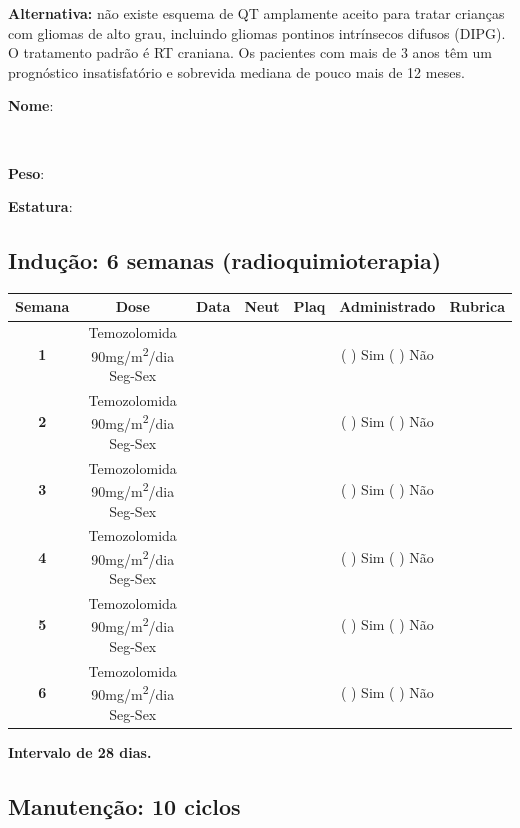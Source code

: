 \documentclass[11pt,a4paper,oldfontcommands]{memoir}
\def\entrywithlabel[#1]#2{\parbox{#1}{{\small #2:} \hrulefill}}
\begin{document}
\textbf{Alternativa:} não existe esquema de QT amplamente aceito para tratar crianças com gliomas de alto grau, incluindo gliomas pontinos intrínsecos difusos (DIPG). O tratamento padrão é RT craniana. Os pacientes com mais de 3 anos têm um prognóstico insatisfatório e sobrevida mediana de pouco mais de 12 meses.
\\[0.4cm]
\entrywithlabel[1\hsize]{\textbf{Nome}}\hfill
\\[0.3cm]
\entrywithlabel[.45\hsize]{\textbf{Peso}}\hfill  \entrywithlabel[.45\hsize]{\textbf{Estatura}}

\subsection{Indução: 6 semanas (radioquimioterapia)}

\begin{center}
\begin{table}[H]
\begin{tabular}{p{1cm}c|c|c|c|c|c}
	\hline
\multicolumn{1}{c|}{\multirow{1}{*}{\textbf{Semana}}}&{Dose}&{Data}&{Neut}&{Plaq}&{Administrado}&{Rubrica} \\
    \hline
    \multicolumn{1}{c|}{\multirow{1}{*}{\textbf{1}}}&{Temozolomida 90mg/m\textsuperscript{2}/dia Seg-Sex}&{}&&&{(  ) Sim (  ) Não}&\\
    \cline{3-5}
    \multicolumn{1}{c|}{\multirow{1}{*}{{\textbf{2}}}}&{Temozolomida 90mg/m\textsuperscript{2}/dia Seg-Sex}&{}&&&{(  ) Sim (  ) Não}&\\
    \cline{3-5}
    \multicolumn{1}{c|}{\multirow{1}{*}{{\textbf{3}}}}&{Temozolomida 90mg/m\textsuperscript{2}/dia Seg-Sex}&{}&&&{(  ) Sim (  ) Não}&\\
    \cline{3-5}
    \multicolumn{1}{c|}{\multirow{1}{*}{{\textbf{4}}}}&{Temozolomida 90mg/m\textsuperscript{2}/dia Seg-Sex}&{}&&&{(  ) Sim (  ) Não}&\\
    \cline{3-5}
    \multicolumn{1}{c|}{\multirow{1}{*}{{\textbf{5}}}}&{Temozolomida 90mg/m\textsuperscript{2}/dia Seg-Sex}&{}&&&{(  ) Sim (  ) Não}&\\
    \cline{3-5}
    \multicolumn{1}{c|}{\multirow{1}{*}{{\textbf{6}}}}&{Temozolomida 90mg/m\textsuperscript{2}/dia Seg-Sex}&{}&&&{(  ) Sim (  ) Não}&\\
    \hline
\end{tabular}
\end{table}
\textbf{Intervalo de 28 dias.}
\end{center}
\pagebreak
\subsection{Manutenção: 10 ciclos}
\end{document}
